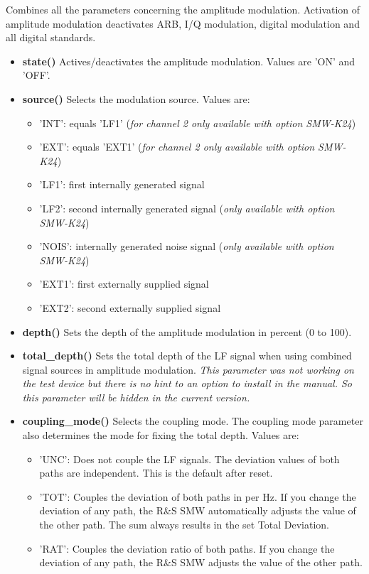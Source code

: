 \documentclass[11pt]{article} %
\begin{document}
Combines all the parameters concerning the amplitude modulation.
Activation of amplitude modulation deactivates ARB, I/Q modulation, digital modulation and all digital standards.
\begin{itemize}
\item {\bf state()} Actives/deactivates the amplitude modulation. Values are 'ON' and 'OFF'.
\item {\bf source()} Selects the modulation source. Values are:
	\begin{itemize}[]
	\item 'INT': equals 'LF1' ({\it for channel 2 only available with option SMW-K24})
	\item 'EXT': equals 'EXT1' ({\it for channel 2 only available with option SMW-K24})
	\item 'LF1': first internally generated signal
	\item 'LF2': second internally generated signal ({\it only available with option SMW-K24})
	\item 'NOIS': internally generated noise signal ({\it only available with option SMW-K24})
	\item 'EXT1': first externally supplied signal
	\item 'EXT2': second externally supplied signal
	\end{itemize}
\item {\bf depth()} Sets the depth of the amplitude modulation in percent (0 to 100).
\item {\bf total\_depth()} Sets the total depth of the LF signal when using combined signal sources in amplitude modulation.
	{\it This parameter was not working on the test device but there is no hint to an option to install in the manual. So this parameter will be hidden in the current version.}
\item {\bf coupling\_mode()} Selects the coupling mode. The coupling mode parameter also determines the mode for fixing the total depth. Values are:
	\begin{itemize}[]
	\item 'UNC': Does not couple the LF signals. The deviation values of both paths are independent. This is the default after reset.
	\item 'TOT': Couples the deviation of both paths in per Hz. If you change the deviation of any path, the R\&S SMW automatically adjusts the value of the other path. The sum always results in the set Total Deviation.
	\item 'RAT': Couples the deviation ratio of both paths. If you change the deviation of any path, the R\&S SMW adjusts the value of the other path.

\end{itemize}
\end{itemize}
\end{document}
